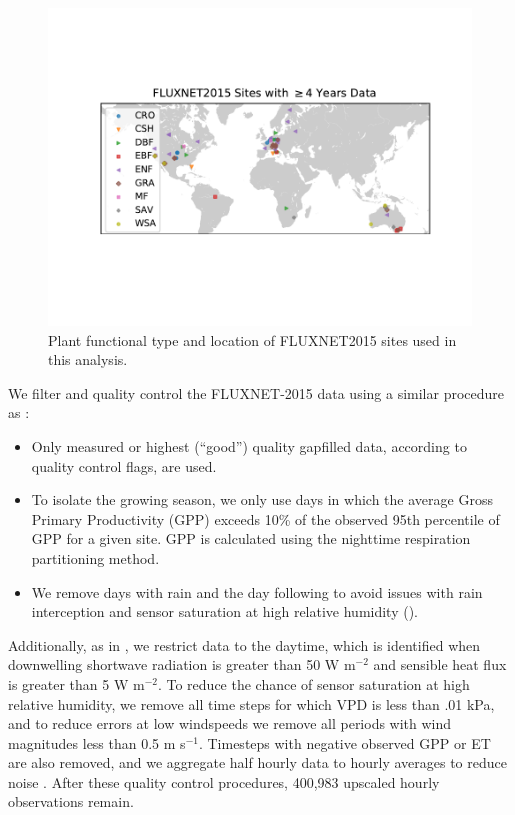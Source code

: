 \documentclass[12pt]{article}
\begin{document}
\begin{figure}[h]
  \centering \includegraphics[trim={0 3cm 0 3cm}, clip]{./map.pdf}
  \caption{Plant functional type and location of FLUXNET2015 sites
    used in this analysis.}
  \label{map_fig}
\end{figure}
We filter and quality control the FLUXNET-2015 data using a similar
procedure as \cite{Zhou_2015}:

 \begin{itemize} 
\item Only measured or highest (``good'') quality gapfilled data,
  according to quality control flags, are used.
\item To isolate the growing season, we only use days in which the
  average Gross Primary Productivity (GPP) exceeds 10\% of the
  observed 95th percentile of GPP for a given site. GPP is calculated
  using the nighttime respiration partitioning method.
\item We remove days with rain and the day following to avoid issues
  with rain interception and sensor saturation at high relative
  humidity (\cite{Medlyn_2017}).
 \end{itemize} 
Additionally, as in \citet{Lin_2018}, we restrict data to the daytime,
which is identified when downwelling shortwave radiation is greater
than 50 W m$^{-2}$ and sensible heat flux is greater than 5 W
m$^{-2}$. To reduce the chance of sensor saturation at high relative
humidity, we remove all time steps for which VPD is less than .01 kPa,
and to reduce errors at low windspeeds we remove all periods with wind
magnitudes less than 0.5 m s$^{-1}$. Timesteps with negative observed
GPP or ET are also removed, and we aggregate half hourly data to
hourly averages to reduce noise \citep{Lin_2018}. After these quality
control procedures, 400,983 upscaled hourly observations remain.
\end{document}
